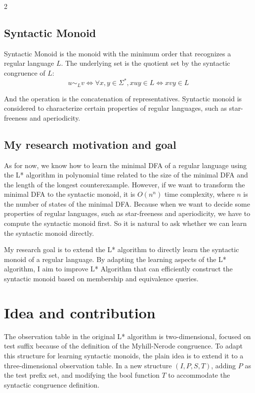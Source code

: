 \documentclass[10pt, a4paper]{article} %
\begin{document}
\begin{multicols}{2}
\subsection{Syntactic Monoid}
Syntactic Monoid is the monoid with the minimum order that recognizes a regular language $L$. The underlying set is the quotient set by the syntactic congruence of $L$:
\begin{equation}
    u \sim_L v \iff \forall x,y \in \Sigma^*, xuy \in L \Leftrightarrow xvy \in L
\end{equation}

And the operation is the concatenation of representatives. Syntactic monoid is considered to characterize certain properties of regular languages, such as star-freeness and aperiodicity. 
\subsection{My research motivation and goal}
As for now, we know how to learn the minimal DFA of a regular language using the L* algorithm in polynomial time related to the size of the minimal DFA and the length of the longest counterexample. 
However, if we want to transform the minimal DFA to the syntactic monoid, it is $O(n^n)$ time complexity, where $n$ is the number of states of the minimal DFA. \cite{holzer2004deterministic}
Because when we want to decide some properties of regular languages, such as star-freeness and aperiodicity, we have to compute the syntactic monoid first. So it is natural to ask whether we can learn the syntactic monoid directly. 

My research goal is to extend the L* algorithm to directly learn the syntactic monoid of a regular language. By adapting the learning aspects of the L* algorithm, I aim to improve L* Algorithm that can efficiently construct the syntactic monoid based on membership and equivalence queries. 

\section{Idea and contribution}
The observation table in the original L* algorithm is two-dimensional, focused on test suffix because of the definition of the Myhill-Nerode congruence. 
To adapt this structure for learning syntactic monoids, the plain idea is to extend it to a three-dimensional observation table. 
In a new structure $(I,P,S,T)$, adding $P$ as the test prefix set, and modifying the bool function $T$ to accommodate the syntactic congruence definition. 


\end{multicols}
\end{document}
